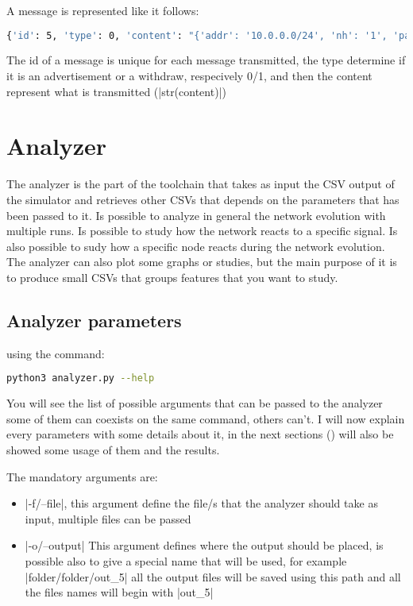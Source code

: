 \documentclass[10pt,journal,onecolumn]{IEEEtran}
\begin{document}
A message is represented like it follows:
\begin{lstlisting}[language=bash]
{'id': 5, 'type': 0, 'content': "{'addr': '10.0.0.0/24', 'nh': '1', 'path': ['1', '0_1', '0'], 'policy_value': '0'}"}
\end{lstlisting}
The id of a message is unique for each message transmitted, the type determine if it
is an advertisement or a withdraw, respecively \num{0}/\num{1}, and then 
the content represent what is transmitted (|str(content)|)

\section{Analyzer}
\label{sec:analyzer}

The analyzer is the part of the toolchain that takes as input the CSV output of
the simulator and retrieves other CSVs that depends on the parameters that has
been passed to it.
Is possible to analyze in general the network evolution with multiple runs.
Is possible to study how the network reacts to a specific signal.
Is also possible to sudy how a specific node reacts during the network evolution.
The analyzer can also plot some graphs or studies, but the main purpose of it 
is to produce small CSVs that groups features that you want to study.

\subsection{Analyzer parameters}
\label{subsec:anal_param}

using the command:
\begin{lstlisting}[language=bash]
python3 analyzer.py --help
\end{lstlisting}
You will see the list of possible arguments that can be passed to the analyzer
some of them can coexists on the same command, others can't.
I will now explain every parameters with some details about it, in the next
sections () will also be showed some
usage of them and the results.

The mandatory arguments are:
\begin{itemize}
	\item |-f/--file|, this argument define the file/s that the analyzer
		should take as input, multiple files can be passed
	\item |-o/--output| This argument defines where the output should
		be placed, is possible also to give a special name that will be used,
		for example |folder/folder/out_5| all the output files will be saved
		using this path and all the files names will begin with |out_5|
\end{itemize}
\end{document}
